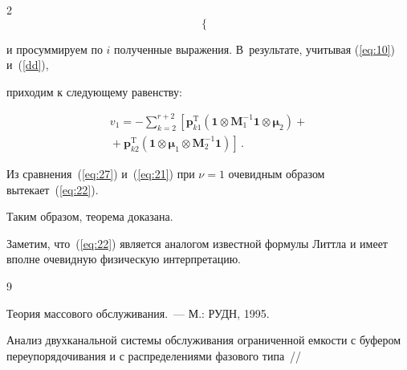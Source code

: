 \begin{multicols}{2}
\begin{equation*}
\begin{cases}
\end{cases}

\end{equation*}

и просуммируем по $i$ полученные выражения. В~результате, учитывая (\ref{eq:10}) и~(\ref{dd}), 

приходим к сле\-ду\-ющему равенству:

\begin{multline}

\label{eq:27}

v_1=-\sum\limits_{k=2}^{r+2}\left[\boldsymbol{p}_{k1}^{\mathrm{T}}

(\boldsymbol{1}\otimes\boldsymbol{M}_1^{-1}\boldsymbol{1} \otimes\boldsymbol{\mu}_2)+{}\right.\\

\left.{}+

\boldsymbol{p}_{k2}^{\mathrm{T}}

(\boldsymbol{1}\otimes\boldsymbol{\mu}_1 \otimes\boldsymbol{M}_2^{-1}\boldsymbol{1})\right]\,.

\end{multline}



Из сравнения~(\ref{eq:27}) и~(\ref{eq:21}) при $\nu=1$ очевидным образом вытекает~(\ref{eq:22}). 

Таким образом, теорема доказана.






Заметим, что~(\ref{eq:22}) является аналогом известной формулы Литтла и имеет вполне очевидную физическую интерпретацию.



{\small\frenchspacing

{%


\begin{thebibliography}{9}





Теория массового обслуживания.~--- М.:  РУДН, 1995.





Анализ двухканальной системы обслуживания ограниченной емкости с буфером переупорядочивания и с распределениями фазового типа~// 


\end{thebibliography}}}
\end{multicols}
